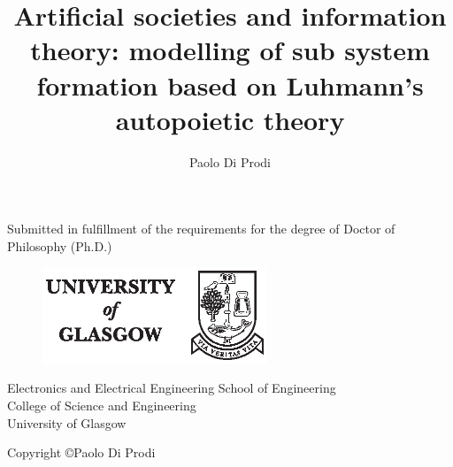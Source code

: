 \documentclass{book}
\title{Artificial societies and information theory: modelling of sub system formation based on Luhmann's autopoietic theory}
\author{Paolo Di Prodi}
\begin{document}
\makenomenclature
\maketitle


\begin{minipage}[center]{0.8\textwidth}
\begin{center}
Submitted in fulfillment of the requirements for
the degree of Doctor of Philosophy (Ph.D.)
\end{center}
\end{minipage}

\begin{figure}[h]
\begin{center}
\includegraphics[width=0.6\textwidth]{UnivLogo.eps} 
\end{center}
\end{figure} 


\begin{minipage}[center]{0.8\textwidth}
\begin{center}
Electronics and Electrical Engineering
School of Engineering\\
College of Science and Engineering\\
University of Glasgow\\
\end{center}
\end{minipage}

\vfill
\begin{minipage}[center]{0.8\textwidth}
\begin{center}
Copyright \copyright Paolo Di Prodi
\end{center}
\end{minipage}

\newpage
\end{document}
